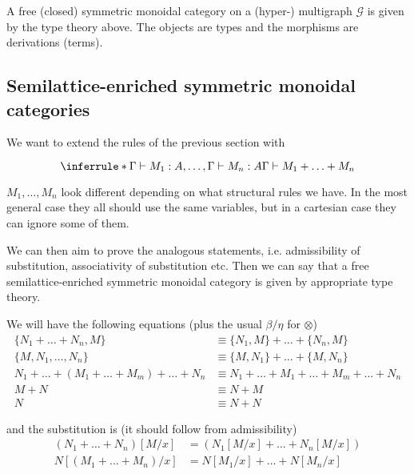 \documentclass[acmsmall,screen, nonacm, anonymous]{acmart}
\begin{document}
\begin{proposition}
  A free (closed) symmetric monoidal category on a (hyper-) multigraph $\mathcal{G}$ is given by the type theory above.
  The objects are types and the morphisms are derivations (terms).
\end{proposition}

\subsection{Semilattice-enriched symmetric monoidal categories}

We want to extend the rules of the previous section with

\[
\inferrule*{\Gamma \vdash M_1 : A, \ldots, \Gamma \vdash M_n : A}{
  \Gamma \vdash M_1 + \ldots + M_n
}
\]

$M_1, \ldots, M_n$ look different depending on what structural rules we have.
In the most general case they all should use the same variables, but in a cartesian case they can ignore some of them.

We can then aim to prove the analogous statements, i.e. admissibility of substitution, associativity of substitution etc.
Then we can say that a free semilattice-enriched symmetric monoidal category is given by appropriate type theory.

We will have the following equations (plus the usual $\beta/\eta$ for $\otimes$) 
\begin{align*}
  \{N_1 + \ldots + N_n, M\} &\equiv \{N_1, M\} + \ldots + \{N_n, M\}\\
  \{M, N_1, \ldots, N_n\} &\equiv \{M, N_1\} + \ldots + \{M, N_n\}\\
  N_1 + \ldots + (M_1 + \ldots + M_m)  + \ldots + N_n &\equiv N_1 + \ldots + M_1 + \ldots + M_m + \ldots + N_n\\
  M + N &\equiv N + M\\
  N &\equiv N + N
\end{align*}

and the substitution is (it should follow from admissibility)
\begin{align*}
(N_1 + \ldots + N_n)[M/x] &= (N_1[M/x] + \ldots + N_n[M/x])\\
N[(M_1 + \ldots + M_n)/x] &= N[M_1/x] + \ldots + N[M_n/x]
\end{align*}
\end{document}
